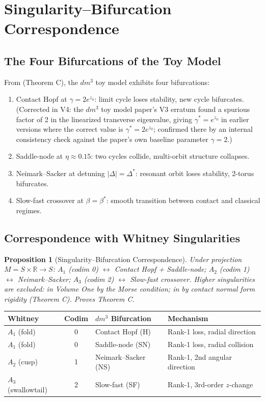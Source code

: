 \documentclass[11pt]{article}
\theoremstyle{boxed}
\newtheorem{proposition}[theorem]{Proposition}
\begin{document}
\section{Singularity--Bifurcation Correspondence}

\subsection{The Four Bifurcations of the Toy Model}

From \cite{dm3} (Theorem C), the $dm^3$ toy model exhibits four bifurcations:
\begin{enumerate}[label=(\roman*)]
  \item Contact Hopf at $\gamma = 2e^{z_0}$: limit cycle loses stability, new cycle bifurcates. (Corrected in V4: the $dm^3$ toy model paper's V3 erratum found a spurious factor of 2 in the linearized transverse eigenvalue, giving $\gamma^{*}=e^{z_0}$ in earlier versions where the correct value is $\gamma^{*}=2e^{z_0}$; confirmed there by an internal consistency check against the paper's own baseline parameter $\gamma=2$.)
  \item Saddle-node at $\eta \approx 0.15$: two cycles collide, multi-orbit structure collapses.
  \item Neimark--Sacker at detuning $|\Delta| = \Delta^{*}$: resonant orbit loses stability, 2-torus bifurcates.
  \item Slow-fast crossover at $\beta = \beta^{*}$: smooth transition between contact and classical regimes.
\end{enumerate}

\subsection{Correspondence with Whitney Singularities}

\begin{proposition}[Singularity--Bifurcation Correspondence]
Under projection $M = S \times \mathbb{R} \to S$:
$A_1$ (codim 0) $\leftrightarrow$ Contact Hopf + Saddle-node;
$A_2$ (codim 1) $\leftrightarrow$ Neimark--Sacker;
$A_3$ (codim 2) $\leftrightarrow$ Slow-fast crossover. Higher singularities are excluded:
in Volume One by the Morse condition; in \cite{GCM} by contact normal form rigidity
(Theorem C). Proves Theorem C.
\end{proposition}

\begin{center}
\begin{tabular}{lcll}
\toprule
\textbf{Whitney} & \textbf{Codim} & \textbf{$dm^3$ Bifurcation} & \textbf{Mechanism}\\
\midrule
$A_1$ (fold) & 0 & Contact Hopf (H) & Rank-1 loss, radial direction\\
$A_1$ (fold) & 0 & Saddle-node (SN) & Rank-1 loss, radial collision\\
$A_2$ (cusp) & 1 & Neimark--Sacker (NS) & Rank-1, 2nd angular direction\\
$A_3$ (swallowtail) & 2 & Slow-fast (SF) & Rank-1, 3rd-order $z$-change\\
\bottomrule
\end{tabular}
\end{center}
\end{document}
